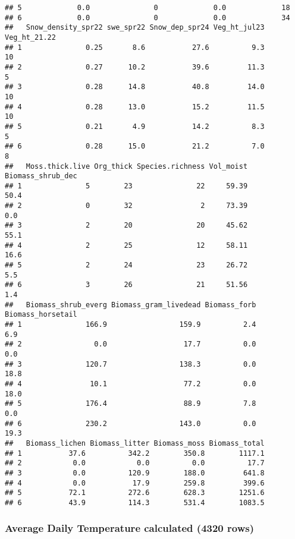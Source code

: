 \documentclass[
]{article}
\begin{document}
\begin{verbatim}
## 5             0.0               0             0.0             18
## 6             0.0               0             0.0             34
##   Snow_density_spr22 swe_spr22 Snow_dep_spr24 Veg_ht_jul23 Veg_ht_21.22
## 1               0.25       8.6           27.6          9.3           10
## 2               0.27      10.2           39.6         11.3            5
## 3               0.28      14.8           40.8         14.0           10
## 4               0.28      13.0           15.2         11.5           10
## 5               0.21       4.9           14.2          8.3            5
## 6               0.28      15.0           21.2          7.0            8
##   Moss.thick.live Org_thick Species.richness Vol_moist Biomass_shrub_dec
## 1               5        23               22     59.39              50.4
## 2               0        32                2     73.39               0.0
## 3               2        20               20     45.62              55.1
## 4               2        25               12     58.11              16.6
## 5               2        24               23     26.72               5.5
## 6               3        26               21     51.56               1.4
##   Biomass_shrub_everg Biomass_gram_livedead Biomass_forb Biomass_horsetail
## 1               166.9                 159.9          2.4               6.9
## 2                 0.0                  17.7          0.0               0.0
## 3               120.7                 138.3          0.0              18.8
## 4                10.1                  77.2          0.0              18.0
## 5               176.4                  88.9          7.8               0.0
## 6               230.2                 143.0          0.0              19.3
##   Biomass_lichen Biomass_litter Biomass_moss Biomass_total
## 1           37.6          342.2        350.8        1117.1
## 2            0.0            0.0          0.0          17.7
## 3            0.0          120.9        188.0         641.8
## 4            0.0           17.9        259.8         399.6
## 5           72.1          272.6        628.3        1251.6
## 6           43.9          114.3        531.4        1083.5
\end{verbatim}

\subsubsection{Average Daily Temperature calculated (4320
rows)}\label{average-daily-temperature-calculated-4320-rows}
\end{document}
